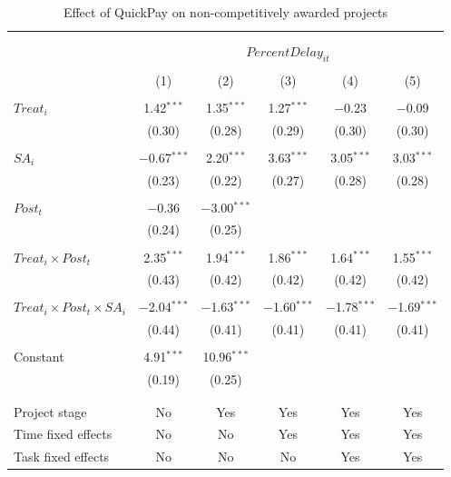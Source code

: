 \documentclass[
]{article}
\begin{document}
\begin{table}[H] \centering 
  \caption{Effect of QuickPay on non-competitively awarded projects} 
  \label{} 
\small 
\begin{tabular}{@{\extracolsep{-2pt}}lccccc} 
\\[-1.8ex]\hline 
\hline \\[-1.8ex] 
\\[-1.8ex] & \multicolumn{5}{c}{$PercentDelay_{it}$  } \\ 
\\[-1.8ex] & (1) & (2) & (3) & (4) & (5)\\ 
\hline \\[-1.8ex] 
 $Treat_i$ & 1.42$^{***}$ & 1.35$^{***}$ & 1.27$^{***}$ & $-$0.23 & $-$0.09 \\ 
  & (0.30) & (0.28) & (0.29) & (0.30) & (0.30) \\ 
  & & & & & \\ 
 $SA_i$ & $-$0.67$^{***}$ & 2.20$^{***}$ & 3.63$^{***}$ & 3.05$^{***}$ & 3.03$^{***}$ \\ 
  & (0.23) & (0.22) & (0.27) & (0.28) & (0.28) \\ 
  & & & & & \\ 
 $Post_t$ & $-$0.36 & $-$3.00$^{***}$ &  &  &  \\ 
  & (0.24) & (0.25) &  &  &  \\ 
  & & & & & \\ 
 $Treat_i \times Post_t$ & 2.35$^{***}$ & 1.94$^{***}$ & 1.86$^{***}$ & 1.64$^{***}$ & 1.55$^{***}$ \\ 
  & (0.43) & (0.42) & (0.42) & (0.42) & (0.42) \\ 
  & & & & & \\ 
 $Treat_i \times Post_t \times SA_i $ & $-$2.04$^{***}$ & $-$1.63$^{***}$ & $-$1.60$^{***}$ & $-$1.78$^{***}$ & $-$1.69$^{***}$ \\ 
  & (0.44) & (0.41) & (0.41) & (0.41) & (0.41) \\ 
  & & & & & \\ 
 Constant & 4.91$^{***}$ & 10.96$^{***}$ &  &  &  \\ 
  & (0.19) & (0.25) &  &  &  \\ 
  & & & & & \\ 
\hline \\[-1.8ex] 
Project stage & No & Yes & Yes & Yes & Yes \\ 
Time fixed effects & No & No & Yes & Yes & Yes \\ 
Task fixed effects & No & No & No & Yes & Yes \\ 

\end{tabular}
\end{table}
\end{document}
